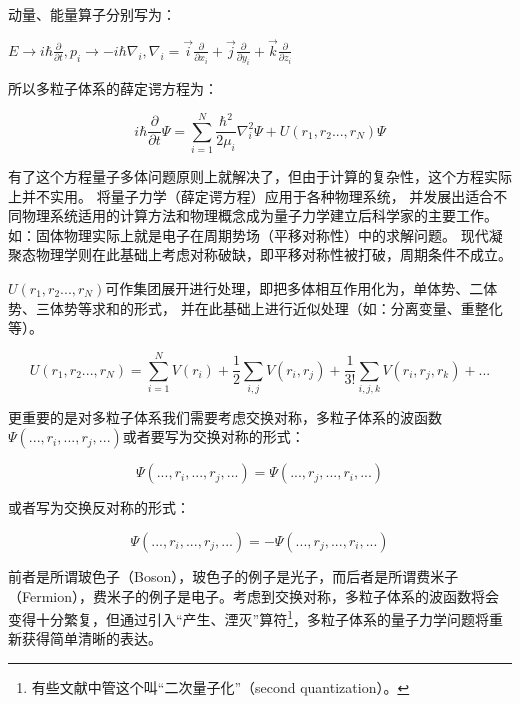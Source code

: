 动量、能量算子分别写为：

\begin{center}
$E \to i\hbar \frac{\partial }{{\partial t}},p_i  \to  - i\hbar \nabla _i ,\nabla _i  = \vec i\frac{\partial }{{\partial x_i }} + \vec j\frac{\partial }{{\partial y_i }} + \vec k\frac{\partial }{{\partial z_i }}$
\end{center}

所以多粒子体系的薛定谔方程为：

\begin{equation}\label{N particle schordinger}
    i\hbar \frac{\partial }{{\partial t}}\Psi  = \sum\limits_{i = 1}^N {\frac{{\hbar ^2 }}{{2\mu _i }}} \nabla _i ^2 \Psi  + U(r_1 ,r_2 ...,r_N )\Psi
\end{equation}

有了这个方程量子多体问题原则上就解决了，但由于计算的复杂性，这个方程实际上并不实用。
将量子力学（薛定谔方程）应用于各种物理系统，
并发展出适合不同物理系统适用的计算方法和物理概念成为量子力学建立后科学家的主要工作。
如：固体物理实际上就是电子在周期势场（平移对称性）中的求解问题。
现代凝聚态物理学则在此基础上考虑对称破缺，即平移对称性被打破，周期条件不成立。


$U(r_1 ,r_2 ...,r_N )$可作集团展开进行处理，即把多体相互作用化为，单体势、二体势、三体势等求和的形式，
并在此基础上进行近似处理（如：分离变量、重整化等）。

\begin{equation*}
U(r_1 ,r_2 ...,r_N ) = \sum\limits_{i = 1}^N {V(r_i )}  + \frac{1}{2}\sum\limits_{i,j} {V(r_i ,r_j )}  + \frac{1}{{3!}}\sum\limits_{i,j,k} {V(r_i ,r_j ,r_k )}  + ...
\end{equation*}

更重要的是对多粒子体系我们需要考虑交换对称，多粒子体系的波函数$\Psi(..., r_i, ..., r_j , ...)$或者要写为交换对称的形式：

\begin{equation*}
\Psi(..., r_i, ..., r_j , ...) = \Psi(..., r_j, ..., r_i , ...)
\end{equation*}

或者写为交换反对称的形式：

\begin{equation*}
\Psi(..., r_i, ..., r_j , ...) = - \Psi(..., r_j, ..., r_i , ...)
\end{equation*}

前者是所谓玻色子（Boson），玻色子的例子是光子，而后者是所谓费米子（Fermion），费米子的例子是电子。考虑到交换对称，多粒子体系的波函数将会变得十分繁复，但通过引入“产生、湮灭”算符\footnote{有些文献中管这个叫“二次量子化”（second quantization）。}，多粒子体系的量子力学问题将重新获得简单清晰的表达。

